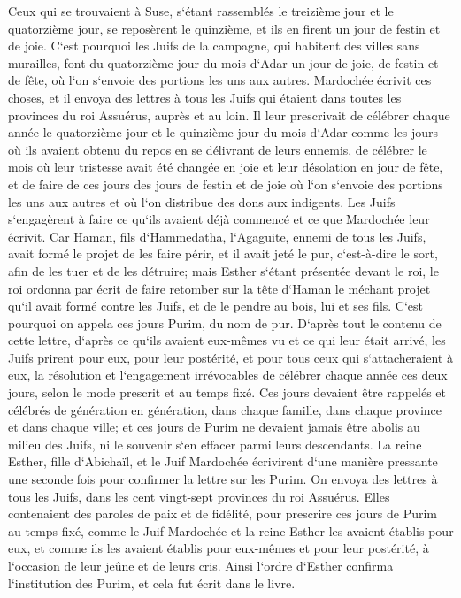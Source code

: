 \verse Ceux qui se trouvaient à Suse, s`étant rassemblés le treizième jour et le quatorzième jour, se reposèrent le quinzième, et ils en firent un jour de festin et de joie. 
\verse C`est pourquoi les Juifs de la campagne, qui habitent des villes sans murailles, font du quatorzième jour du mois d`Adar un jour de joie, de festin et de fête, où l`on s`envoie des portions les uns aux autres. 
\verse Mardochée écrivit ces choses, et il envoya des lettres à tous les Juifs qui étaient dans toutes les provinces du roi Assuérus, auprès et au loin. 
\verse Il leur prescrivait de célébrer chaque année le quatorzième jour et le quinzième jour du mois d`Adar 
\verse comme les jours où ils avaient obtenu du repos en se délivrant de leurs ennemis, de célébrer le mois où leur tristesse avait été changée en joie et leur désolation en jour de fête, et de faire de ces jours des jours de festin et de joie où l`on s`envoie des portions les uns aux autres et où l`on distribue des dons aux indigents. 
\verse Les Juifs s`engagèrent à faire ce qu`ils avaient déjà commencé et ce que Mardochée leur écrivit. 
\verse Car Haman, fils d`Hammedatha, l`Agaguite, ennemi de tous les Juifs, avait formé le projet de les faire périr, et il avait jeté le pur, c`est-à-dire le sort, afin de les tuer et de les détruire; 
\verse mais Esther s`étant présentée devant le roi, le roi ordonna par écrit de faire retomber sur la tête d`Haman le méchant projet qu`il avait formé contre les Juifs, et de le pendre au bois, lui et ses fils. 
\verse C`est pourquoi on appela ces jours Purim, du nom de pur. D`après tout le contenu de cette lettre, d`après ce qu`ils avaient eux-mêmes vu et ce qui leur était arrivé, 
\verse les Juifs prirent pour eux, pour leur postérité, et pour tous ceux qui s`attacheraient à eux, la résolution et l`engagement irrévocables de célébrer chaque année ces deux jours, selon le mode prescrit et au temps fixé. 
\verse Ces jours devaient être rappelés et célébrés de génération en génération, dans chaque famille, dans chaque province et dans chaque ville; et ces jours de Purim ne devaient jamais être abolis au milieu des Juifs, ni le souvenir s`en effacer parmi leurs descendants. 
\verse La reine Esther, fille d`Abichaïl, et le Juif Mardochée écrivirent d`une manière pressante une seconde fois pour confirmer la lettre sur les Purim. 
\verse On envoya des lettres à tous les Juifs, dans les cent vingt-sept provinces du roi Assuérus. Elles contenaient des paroles de paix et de fidélité, 
\verse pour prescrire ces jours de Purim au temps fixé, comme le Juif Mardochée et la reine Esther les avaient établis pour eux, et comme ils les avaient établis pour eux-mêmes et pour leur postérité, à l`occasion de leur jeûne et de leurs cris. 
\verse Ainsi l`ordre d`Esther confirma l`institution des Purim, et cela fut écrit dans le livre. 

